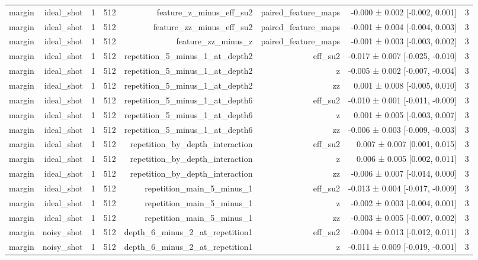 \begin{table}
\begin{tabular}{lrrrrrrr}
margin & ideal\_shot & 1 & 512 & feature\_z\_minus\_eff\_su2 & paired\_feature\_maps & -0.000 ± 0.002 [-0.002, 0.001] & 3 \\
margin & ideal\_shot & 1 & 512 & feature\_zz\_minus\_eff\_su2 & paired\_feature\_maps & -0.001 ± 0.004 [-0.004, 0.003] & 3 \\
margin & ideal\_shot & 1 & 512 & feature\_zz\_minus\_z & paired\_feature\_maps & -0.001 ± 0.003 [-0.003, 0.002] & 3 \\
margin & ideal\_shot & 1 & 512 & repetition\_5\_minus\_1\_at\_depth2 & eff\_su2 & -0.017 ± 0.007 [-0.025, -0.010] & 3 \\
margin & ideal\_shot & 1 & 512 & repetition\_5\_minus\_1\_at\_depth2 & z & -0.005 ± 0.002 [-0.007, -0.004] & 3 \\
margin & ideal\_shot & 1 & 512 & repetition\_5\_minus\_1\_at\_depth2 & zz & 0.001 ± 0.008 [-0.005, 0.010] & 3 \\
margin & ideal\_shot & 1 & 512 & repetition\_5\_minus\_1\_at\_depth6 & eff\_su2 & -0.010 ± 0.001 [-0.011, -0.009] & 3 \\
margin & ideal\_shot & 1 & 512 & repetition\_5\_minus\_1\_at\_depth6 & z & 0.001 ± 0.005 [-0.003, 0.007] & 3 \\
margin & ideal\_shot & 1 & 512 & repetition\_5\_minus\_1\_at\_depth6 & zz & -0.006 ± 0.003 [-0.009, -0.003] & 3 \\
margin & ideal\_shot & 1 & 512 & repetition\_by\_depth\_interaction & eff\_su2 & 0.007 ± 0.007 [0.001, 0.015] & 3 \\
margin & ideal\_shot & 1 & 512 & repetition\_by\_depth\_interaction & z & 0.006 ± 0.005 [0.002, 0.011] & 3 \\
margin & ideal\_shot & 1 & 512 & repetition\_by\_depth\_interaction & zz & -0.006 ± 0.007 [-0.014, 0.000] & 3 \\
margin & ideal\_shot & 1 & 512 & repetition\_main\_5\_minus\_1 & eff\_su2 & -0.013 ± 0.004 [-0.017, -0.009] & 3 \\
margin & ideal\_shot & 1 & 512 & repetition\_main\_5\_minus\_1 & z & -0.002 ± 0.003 [-0.004, 0.001] & 3 \\
margin & ideal\_shot & 1 & 512 & repetition\_main\_5\_minus\_1 & zz & -0.003 ± 0.005 [-0.007, 0.002] & 3 \\
margin & noisy\_shot & 1 & 512 & depth\_6\_minus\_2\_at\_repetition1 & eff\_su2 & -0.004 ± 0.013 [-0.012, 0.011] & 3 \\
margin & noisy\_shot & 1 & 512 & depth\_6\_minus\_2\_at\_repetition1 & z & -0.011 ± 0.009 [-0.019, -0.001] & 3 \\

\end{tabular}
\end{table}
